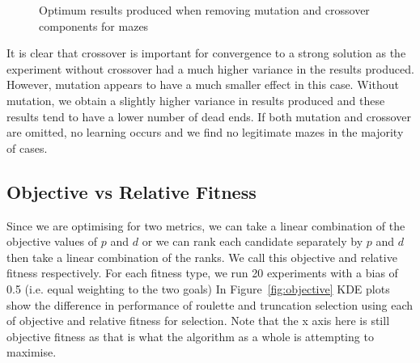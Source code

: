 \begin{figure}[!h]
\centering
            \hfill
            \hfill
            \hfill
            \caption{Optimum results produced when removing mutation and crossover components for mazes}
\label{fig:maze-ablation}
\end{figure}

It is clear that crossover is important for convergence to a strong solution as the experiment without crossover had a much higher variance in the results produced. However, mutation appears to have a much smaller effect in this case. Without mutation, we obtain a slightly higher variance in results produced and these results tend to have a lower number of dead ends. If both mutation and crossover are omitted, no learning occurs and we find no legitimate mazes in the majority of cases.

\subsection{Objective vs Relative Fitness}

Since we are optimising for two metrics, we can take a linear combination of the objective values of $p$ and $d$ or we can rank each candidate separately by $p$ and $d$ then take a linear combination of the ranks. We call this objective and relative fitness respectively. For each fitness type, we run 20 experiments with a bias of 0.5 (i.e. equal weighting to the two goals) In Figure~\ref{fig:objective} KDE plots show the difference in performance of roulette and truncation selection using each of objective and relative fitness for selection. Note that the x axis here is still objective fitness as that is what the algorithm as a whole is attempting to maximise.\\

